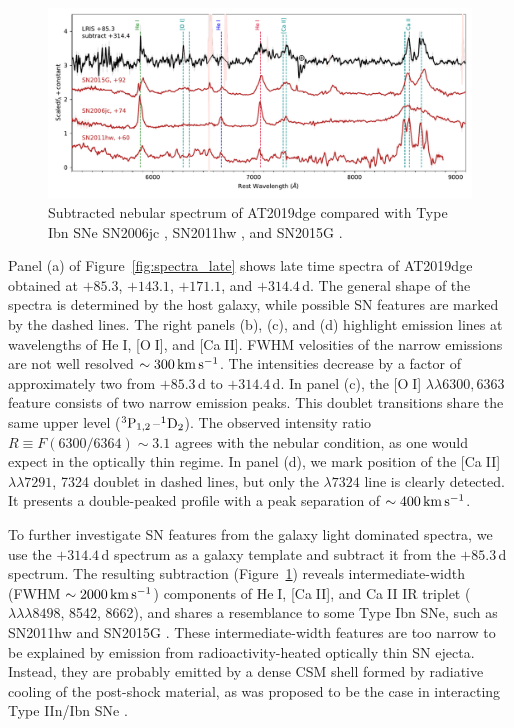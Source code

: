 \documentclass[twocolumn]{aastex63}
\def\ion#1#2{#1$\;${\footnotesize\rm{#2}}\relax}
\newcommand{\todo}[1]{{\color{magenta} to-do: {#1}}}
\begin{document}
\begin{CJK*}{UTF8}{gbsn}
\begin{figure}
		\centering
	\includegraphics[width=\textwidth]{figures/spec_host_subtracted.pdf}
		\caption{Subtracted nebular spectrum of AT2019dge compared with Type Ibn SNe SN2006jc 
		\citep{Shivvers2019}, 
		SN2011hw \citep{Pastorello2015}, and SN2015G \citep{Shivvers2017}.
		\label{fig:spec_subtract}}
\end{figure}
Panel (a) of Figure~\ref{fig:spectra_late} shows late time spectra of AT2019dge obtained at $+85.3$, 
$+143.1$, $+171.1$, and $+314.4$\,d.  The general shape of the spectra is determined by the host 
galaxy, while possible SN features are marked by the dashed lines. The right panels (b), (c), and (d) 
highlight emission lines at wavelengths of \ion{He}{I}, [\ion{O}{I}], and [\ion{Ca}{II}]. FWHM velosities 
of the narrow emissions are not well resolved $\sim 300\,{\rm km\,s^{-1}}$. 
The intensities decrease by a factor of approximately two from $+85.3$\,d to $+314.4$\,d. In panel (c), 
the [\ion{O}{I}] $\lambda \lambda 6300, 6363$ feature consists of two narrow emission 
peaks. This doublet transitions share the same upper level ($\rm ^{3}P_{1,2}$--$\rm ^{1}D_2$). The 
observed intensity ratio $R \equiv F(6300/6364) \sim 3.1$ agrees with the nebular condition, as one 
would expect in the optically thin regime. In panel (d), we mark position of the [\ion{Ca}{II}] 
$\lambda \lambda 7291$, 7324 doublet in dashed lines, but only the $\lambda 
7324$ line is clearly detected. It presents a double-peaked profile with a peak separation of $\sim 
400\,{\rm km\,s^{-1}}$. 

To further investigate SN features from the galaxy light dominated spectra, we use the $+314.4$\,d 
spectrum as a galaxy template and subtract it from the $+85.3$\,d spectrum. The resulting subtraction 
(Figure~\ref{fig:spec_subtract}) reveals intermediate-width (FWHM $\sim 
2000\,{\rm km\,s^{-1}}$) components of \ion{He}{I}, [\ion{Ca}{II}], and \ion{Ca}{II} IR triplet ($\lambda 
\lambda \lambda 8498$, 8542, 8662), and shares a resemblance to some 
Type Ibn SNe, such as SN2011hw \citep{Pastorello2015} and SN2015G \citep{Shivvers2017}. These 
intermediate-width features are too narrow to be explained by emission from
radioactivity-heated optically thin SN ejecta. Instead, they are probably emitted by a dense  CSM shell 
formed by radiative cooling of the  post-shock material, as was proposed to be the case in interacting 
Type IIn/Ibn SNe \citep{Chugai1994, Smith2017}. 


\end{CJK*}
\end{document}
